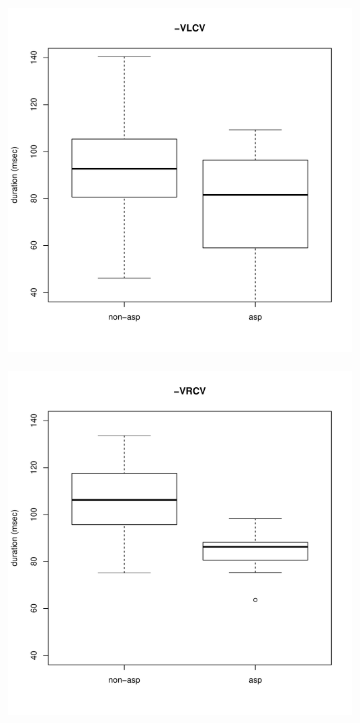 \documentclass[11pt,a4paper,openany]{memoir}\usepackage[]{graphicx}\usepackage[]{color}
\newenvironment{knitrout}{}{} %
\begin{document}
\begin{figure}
\begin{subfigure}{.5\textwidth}
\centering
\begin{knitrout}
\color{fgcolor}
\includegraphics[width=\textwidth]{img/di-lat-clos-box-1} 

\end{knitrout}
\end{subfigure}
\begin{subfigure}{.5\textwidth}
\centering
\begin{knitrout}
\color{fgcolor}
\includegraphics[width=\textwidth]{img/di-rho-clos-box-1} 


\end{knitrout}
\end{subfigure}
\end{figure}
\end{document}
